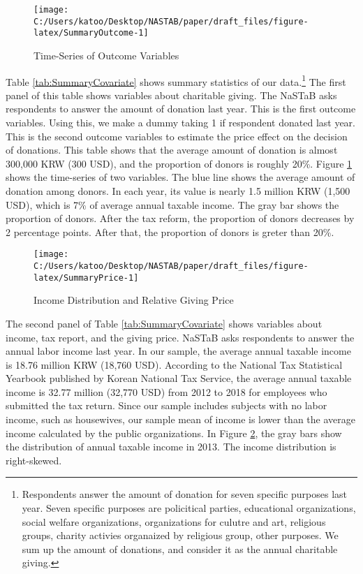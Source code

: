 \documentclass[
  11pt,
  a4paper,
]{article}
\begin{document}
\begin{figure}[t]

{\centering \texttt{[image: C:/Users/katoo/Desktop/NASTAB/paper/draft\_files/figure-latex/SummaryOutcome-1]} 

}

\caption{Time-Series of Outcome Variables}\label{fig:SummaryOutcome}
\end{figure}

Table \ref{tab:SummaryCovariate}
shows summary statistics of our data.\footnote{Respondents answer the amount of donation for seven specific purposes last year. Seven specific purposes are policitical parties, educational organizations, social welfare organizations, organizations for culutre and art, religious groups, charity activies organaized by religious group, other purposes. We sum up the amount of donations, and consider it as the annual charitable giving.}
The first panel of this table shows variables about charitable giving.
The NaSTaB asks respondents to answer the amount of donation last year.
This is the first outcome variables.
Using this, we make a dummy taking 1 if respondent donated last year.
This is the second outcome variables to
estimate the price effect on the decision of donations.
This table shows that
the average amount of donation is almost 300,000 KRW (300 USD),
and the proportion of donors is roughly 20\%.
Figure \ref{fig:SummaryOutcome} shows the time-series of two variables.
The blue line shows the average amount of donation among donors.
In each year, its value is nearly 1.5 million KRW (1,500 USD),
which is 7\% of average annual taxable income.
The gray bar shows the proportion of donors.
After the tax reform, the proportion of donors decreases
by 2 percentage points.
After that, the proportion of donors is greter than 20\%.

\begin{figure}[t]

{\centering \texttt{[image: C:/Users/katoo/Desktop/NASTAB/paper/draft\_files/figure-latex/SummaryPrice-1]} 

}

\caption{Income Distribution and Relative Giving Price}\label{fig:SummaryPrice}
\end{figure}

The second panel of Table \ref{tab:SummaryCovariate}
shows variables about income, tax report, and the giving price.
NaSTaB asks respondents to answer the annual labor income last year.
In our sample,
the average annual taxable income is 18.76 million KRW (18,760 USD).
According to the National Tax Statistical Yearbook
published by Korean National Tax Service,
the average annual taxable income is
32.77 million (32,770 USD) from 2012 to 2018
for employees who submitted the tax return.
Since our sample includes subjects with no labor income, such as housewives,
our sample mean of income is lower than
the average income calculated by the public organizations.
In Figure \ref{fig:SummaryPrice},
the gray bars show the distribution of annual taxable income in 2013.
The income distribution is right-skewed.
\end{document}
